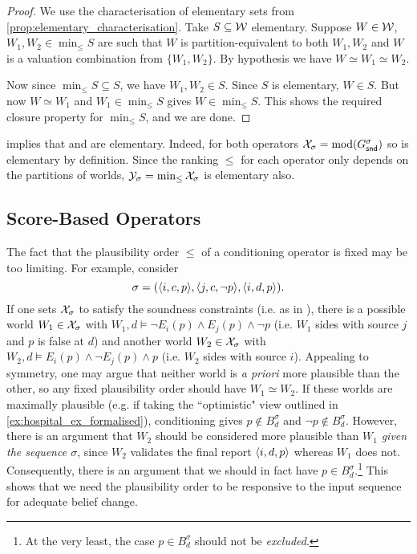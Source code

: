 \begin{proof}
    We use the characterisation of elementary sets from
    \cref{prop:elementary_characterisation}. Take $S \subseteq \mathcal{W}$ elementary.
    Suppose $W \in \mathcal{W}$, $W_1, W_2 \in \min_{\le}{S}$ are such that $W$ is
    partition-equivalent to both $W_1, W_2$ and $W$ is a valuation combination
    from $\{W_1, W_2\}$. By hypothesis we have $W \simeq W_1 \simeq W_2$.

    Now since $\min_{\le}{S} \subseteq S$, we have $W_1, W_2 \in S$. Since $S$
    is elementary, $W \in S$. But now $W \simeq W_1$ and $W_1 \in
    \min_{\le}{S}$ gives $W \in \min_{\le}{S}$. This shows the required closure
    property for $\min_{\le}{S}$, and we are done.
\end{proof}

 implies that
\varbasedcond{} and \partbasedcond{} are elementary. Indeed, for both operators
$\mathcal{X}_\sigma = \operatorname{mod}(G^\sigma_{\mathsf{snd}})$ so is elementary by definition. Since the
ranking $\le$ for each operator only depends on the partitions of worlds,
$\mathcal{Y}_\sigma =
\min_{\le}{\mathcal{X}_\sigma}$ is elementary also.

\subsection{Score-Based Operators}
\label{sec:score_based}

The fact that the plausibility order $\le$ of a conditioning operator is fixed
may be too limiting. For example, consider
\[
    \sigma
    =
    (\langle {i, c, p} \rangle,
    \langle {j, c, \neg p} \rangle,
    \langle {i, d, p} \rangle).
\]
%
If one sets $\mathcal{X}_\sigma$ to satisfy the soundness constraints (i.e. as in
\weakop{}), there is a possible
world $W_1 \in \mathcal{X}_\sigma$ with $W_1, d \models \neg E_i(p) \land E_j(p) \land
\neg p$ (i.e. $W_1$ sides with source $j$ and $p$ is false at $d$) and another
world $W_2 \in \mathcal{X}_\sigma$ with $W_2, d \models E_i(p) \land \neg E_j(p) \land
p$ (i.e. $W_2$ sides with source $i$). Appealing to symmetry, one may argue
that neither world is \emph{a priori} more plausible than the other, so any
fixed plausibility order should have $W_1 \simeq W_2$. If these worlds
are maximally plausible (e.g. if taking the ``optimistic" view outlined in
\cref{ex:hospital_ex_formalised}), conditioning gives $p \notin B^\sigma_d$ and
$\neg p \notin B^\sigma_d$.
%
However, there is an argument that $W_2$ should be considered more plausible
than $W_1$ \emph{given the sequence $\sigma$}, since $W_2$ validates the final
report $\langle {i, d, p} \rangle$ whereas $W_1$ does not. Consequently, there is an
argument that we should in fact have $p \in B^\sigma_d$.\footnote{At the very
least, the case $p \in B^\sigma_d$ should not be \emph{excluded}.} This shows
that we need the plausibility order to be responsive to the input sequence for
adequate belief change.\footnotemark{}

